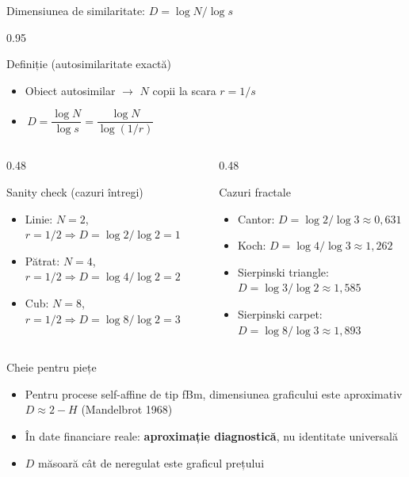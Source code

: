 \documentclass[9pt, aspectratio=169, t]{beamer}
\begin{document}
\begin{frame}[shrink=15]{Dimensiunea de similaritate: $D=\log N/\log s$}
\begin{cminipage}{0.95\textwidth}
\begin{block}{Definiție (autosimilaritate exactă)}
\begin{itemize}\setlength{\itemsep}{0pt}
    \item Obiect autosimilar $\to$ $N$ copii la scara $r=1/s$
    \item $\boxed{\,D=\dfrac{\log N}{\log s}=\dfrac{\log N}{\log(1/r)}\,}$
\end{itemize}
\end{block}
\begin{columns}[T]
\begin{column}{0.48\textwidth}
\begin{exampleblock}{Sanity check (cazuri întregi)}
\begin{itemize}\setlength{\itemsep}{0pt}
    \item Linie: $N=2$, $r=1/2 \Rightarrow D=\log 2/\log 2=1$
    \item Pătrat: $N=4$, $r=1/2 \Rightarrow D=\log 4/\log 2=2$
    \item Cub: $N=8$, $r=1/2 \Rightarrow D=\log 8/\log 2=3$
\end{itemize}
\end{exampleblock}
\end{column}
\begin{column}{0.48\textwidth}
\begin{alertblock}{Cazuri fractale}
\begin{itemize}\setlength{\itemsep}{0pt}
    \item Cantor: $D=\log 2/\log 3\approx 0{,}631$
    \item Koch: $D=\log 4/\log 3\approx 1{,}262$
    \item Sierpinski triangle: $D=\log 3/\log 2\approx 1{,}585$
    \item Sierpinski carpet: $D=\log 8/\log 3\approx 1{,}893$
\end{itemize}
\end{alertblock}
\end{column}
\end{columns}
\vspace{0.1cm}
\begin{exampleblock}{Cheie pentru piețe}
\begin{itemize}\setlength{\itemsep}{0pt}
    \item Pentru procese self-affine de tip fBm, dimensiunea graficului este aproximativ $D\approx 2-H$ (Mandelbrot 1968)
    \item În date financiare reale: \textbf{aproximație diagnostică}, nu identitate universală
    \item $D$ măsoară cât de neregulat este graficul prețului
\end{itemize}
\end{exampleblock}
\end{cminipage}
\end{frame}
\end{document}
